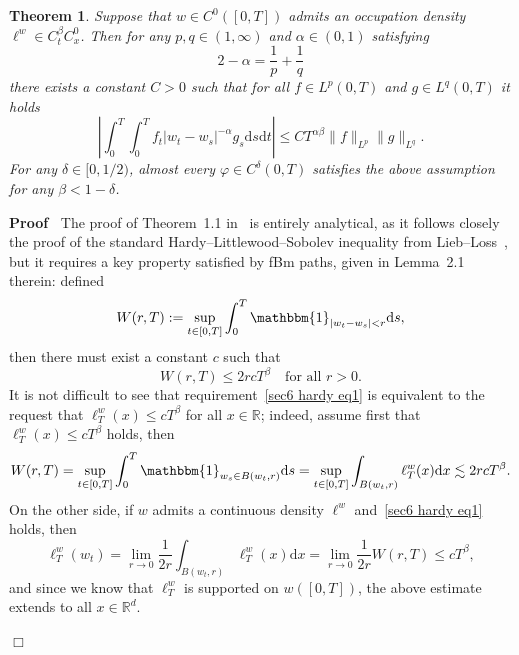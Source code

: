 \documentclass[10pt]{article}
\newcommand{\assign}{:=}
\newcommand{\mathd}{\mathrm{d}}
\newenvironment{proof}{\noindent\textbf{Proof\ }}{\hspace*{\fill}$\Box$\medskip}
\newtheorem{theorem}{Theorem}
\begin{document}
\begin{theorem}
  \label{sec6 thm hardy}Suppose that $w \in C^0 ([0, T])$ admits an occupation
  density $\ell^w \in C^{\beta}_t C^0_x$. Then for any $p, q \in (1, \infty)$
  and $\alpha \in (0, 1)$ satisfying
  \[ 2 - \alpha = \frac{1}{p} + \frac{1}{q} \]
  there exists a constant $C > 0$ such that for all $f \in L^p (0, T)$ and $g
  \in L^q (0, T)$ it holds
  \[ \left| \int_0^T \int_0^T f_t  | w_t - w_s |^{- \alpha} g_s \mathd s
     \mathd t \right| \leqslant C T^{\alpha \beta}  \| f \|_{L^p} \| g
     \|_{L^q} . \]
  For any $\delta \in [0, 1 / 2)$, almost every $\varphi \in C^{\delta} (0,
  T)$ satisfies the above assumption for any $\beta < 1 - \delta$.
\end{theorem}

\begin{proof}
  The proof of Theorem~1.1 in~{\cite{duboscq}} is entirely analytical, as it
  follows closely the proof of the standard Hardy--Littlewood--Sobolev
  inequality from Lieb--Loss~{\cite{lieb}}, but it requires a key property
  satisfied by fBm paths, given in Lemma~2.1 therein: defined
  \[ W (r, T) \assign \sup_{t \in [0, T]} \int_0^T \mathbbm{1}_{| w_t - w_s |
     < r} \mathd s, \]
  then there must exist a constant $c$ such that
  \begin{equation}
    W (r, T) \leqslant 2 r c T^{\beta} \quad \text{for all } r > 0.
    \label{sec6 hardy eq1}
  \end{equation}
  It is not difficult to see that requirement~{\eqref{sec6 hardy eq1}} is
  equivalent to the request that $\ell^w_T (x) \leqslant c T^{\beta}$ for all
  $x \in \mathbb{R}$; indeed, assume first that $\ell^w_T (x) \leqslant c
  T^{\beta}$ holds, then
  \[ W (r, T) = \sup_{t \in [0, T]} \int_0^T \mathbbm{1}_{w_s \in B (w_t, r)}
     \mathd s = \sup_{t \in [0, T]} \int_{B (w_t, r)} \ell^w_T (x) \mathd x
     \lesssim 2 r c T^{\beta} . \]
  On the other side, if $w$ admits a continuous density $\ell^w$
  and~{\eqref{sec6 hardy eq1}} holds, then
  \[ \ell^w_T (w_t) = \lim_{r \rightarrow 0} \frac{1}{2 r} \int_{B (w_t, r)}
     \ell^w_T (x) \mathd x = \lim_{r \rightarrow 0} \frac{1}{2 r} W (r, T)
     \leqslant c T^{\beta}, \]
  and since we know that $\ell^w_T$ is supported on $w ([0, T])$, the above
  estimate extends to all $x \in \mathbb{R}^d$.
  

\end{proof}
\end{document}
